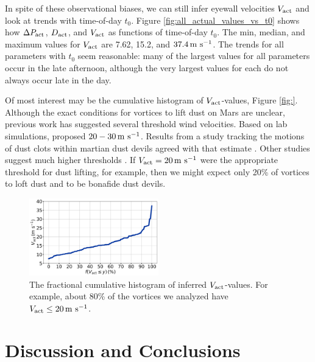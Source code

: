 \documentclass{aastex63}
\begin{document}
In spite of these observational biases, we can still infer eyewall velocities $V_{\rm act}$ and look at trends with time-of-day $t_0$. Figure \ref{fig:all_actual_values_vs_t0} shows how $\Delta P_{\rm act}$, $D_{\rm act}$, and $V_{\rm act}$ as functions of time-of-day $t_0$. The min, median, and maximum values for $V_{\rm act}$ are 7.62, 15.2, and $37.4\,{\rm m\ s^{-1}}$. The trends for all parameters with $t_0$ seem reasonable: many of the largest values for all parameters occur in the late afternoon, although the very largest values for each do not always occur late in the day. 

Of most interest may be the cumulative histogram of $V_{\rm act}$-values, Figure \ref{fig:}. Although the exact conditions for vortices to lift dust on Mars are unclear, previous work has suggested several threshold wind velocities. Based on lab simulations, \citet{2003JGRE..108.5041G} proposed $20-30\,{\rm m\ s^{-1}}$. Results from a study tracking the motions of dust clots within martian dust devils agreed with that estimate \citep{2011GeoRL..3824206C}. Other studies suggest much higher thresholds \citep[cf.][]{202006JGRE..11112002C06}. If $V_{\rm act} = 20\,{\rm m\ s^{-1}}$ were the appropriate threshold for dust lifting, for example, then we might expect only 20\% of vortices to loft dust and to be bonafide dust devils. \citet{}

\begin{figure}
    \centering
    \includegraphics[width=0.5\textwidth]{figures/cum_hist_Vact.png}
    \caption{The fractional cumulative histogram of inferred $V_{\rm act}$-values. For example, about 80\% of the vortices we analyzed have $V_{\rm act} \leq 20\,{\rm m\ s^{-1}}$.}
    \label{fig:cum_hist_Vact}
\end{figure}


\section{Discussion and Conclusions}
\label{sec:Discussion and Conclusions}
\end{document}
